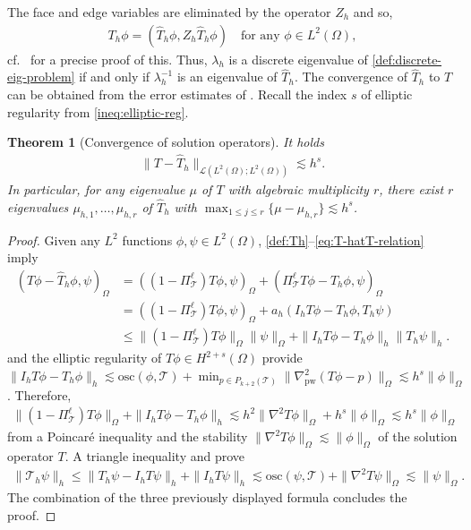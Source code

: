 \documentclass[a4paper]{amsart}
\numberwithin{equation}{section}
\def\T{\mathcal{T}}
\def\pw{\mathrm{pw}}
\newtheorem{theorem}{Theorem}[section]
\theoremstyle{definition}
\theoremstyle{remark}
\numberwithin{theorem}{section}
\numberwithin{equation}{section}
\numberwithin{table}{section}
\numberwithin{figure}{section}
\begin{document}
The face and edge variables are eliminated by the operator $Z_h$ and so, 
\begin{align}\label{eq:T-hatT-relation}
	T_h \phi = (\hat{T}_h \phi, Z_h \hat{T}_h \phi) \quad\text{for any } \phi \in L^2(\Omega),
\end{align}
cf.~\cite[Lemma 3.1]{CaloCicuttinDengErn2019} for a precise proof of this. Thus, $\lambda_h$ is a discrete eigenvalue of \eqref{def:discrete-eig-problem} if and only if $\lambda_h^{-1}$ is an eigenvalue of $\hat{T}_h$.
The convergence of $\hat{T}_h$ to $T$ can be obtained from the error estimates of .
Recall the index $s$ of elliptic regularity from \eqref{ineq:elliptic-reg}.
\begin{theorem}[Convergence of solution operators]\label{thm:spectral-correctness}
	It holds
	\begin{align*}
		\|T - \hat{T}_h\|_{\mathcal{L}(L^2(\Omega); L^2(\Omega))} \lesssim h^s.
	\end{align*}
	In particular, for any eigenvalue $\mu$ of $T$ with algebraic multiplicity $r$, there exist $r$ eigenvalues $\mu_{h,1}, \dots, \mu_{h,r}$ of $\hat{T}_h$ with $\max_{1 \leq j \leq r}\{\mu - \mu_{h,r}\} \lesssim h^s$.
\end{theorem}
\begin{proof}
	Given any $L^2$ functions $\phi, \psi \in L^2(\Omega)$, \eqref{def:Th}--\eqref{eq:T-hatT-relation} imply
	\begin{align*}
		(T\phi - \hat{T}_h\phi, \psi)_\Omega &= ((1 - \Pi_\T^\ell) T\phi, \psi)_\Omega + (\Pi_\T^\ell T\phi - \hat{T}_h \phi, \psi)_\Omega\\
		&= ((1 - \Pi_\T^\ell) T\phi, \psi)_\Omega + a_h(I_h T \phi - T_h \phi, T_h \psi)\\
		&\leq \|(1 - \Pi_\T^\ell) T\phi\|_\Omega\|\psi\|_\Omega + \|I_h T \phi - T_h \phi\|_h\|T_h \psi\|_h.
	\end{align*}
	 and the elliptic regularity of $T \phi \in H^{2+s}(\Omega)$ provide $\|I_h T \phi - T_h \phi\|_h \lesssim \mathrm{osc}(\phi, \T)+ \min_{p \in P_{k+2}(\T)} \|\nabla_\pw^2(T \phi - p)\|_\Omega \lesssim h^s\|\phi\|_\Omega$. Therefore,
	\begin{align*}
		\|(1 - \Pi_\T^\ell) T\phi\|_\Omega + \|I_h T \phi - T_h \phi\|_h \lesssim h^2\|\nabla^2 T\phi\|_\Omega + h^s\|\phi\|_\Omega \lesssim h^s\|\phi\|_\Omega
	\end{align*}
	from a Poincar\'e inequality and the stability $\|\nabla^2 T \phi\|_\Omega \lesssim \|\phi\|_\Omega$ of the solution operator $T$.
	A triangle inequality and  prove
	\begin{align*}
		\|\T_h \psi\|_h \leq \|T_h \psi - I_h T \psi\|_h + \|I_h T \psi\|_h \lesssim \mathrm{osc}(\psi, \T) + \|\nabla^2 T \psi\|_\Omega \lesssim \|\psi\|_{\Omega}.
	\end{align*}
	The combination of the three previously displayed formula concludes the proof.
\end{proof}
\end{document}
